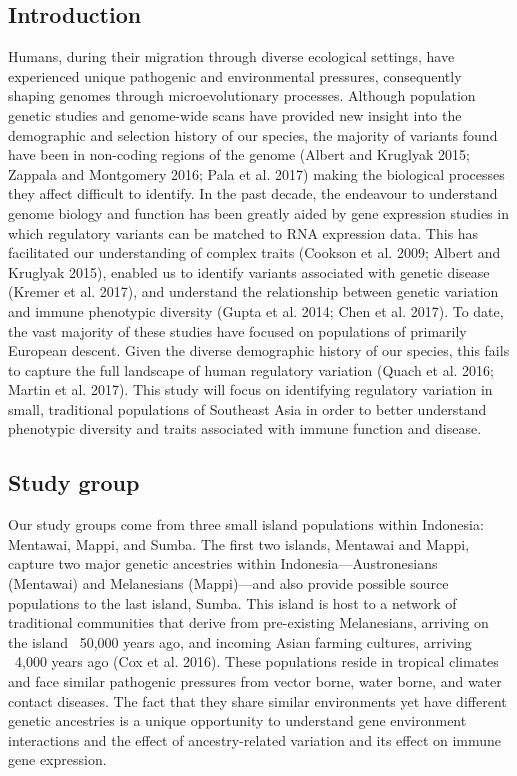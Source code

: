 \documentclass[12pt,a4paper,titlepage,twoside,openright]{book}
\begin{document}
\begin{mainmatter}
\mainmatterheadings

\chapter{Introduction}\label{}
Humans, during their migration through diverse ecological settings, have experienced unique pathogenic and environmental pressures, consequently shaping genomes through microevolutionary processes. Although population genetic studies and genome-wide scans have provided new insight into the demographic and selection history of our species, the majority of variants found have been in non-coding regions of the genome (Albert and Kruglyak 2015; Zappala and Montgomery 2016; Pala et al. 2017) making the biological processes they affect difficult to identify. In the past decade, the endeavour to understand genome biology and function has been greatly aided by gene expression studies in which regulatory variants can be matched to RNA expression data. This has facilitated our understanding of complex traits (Cookson et al. 2009; Albert and Kruglyak 2015), enabled us to identify variants associated with genetic disease (Kremer et al. 2017), and understand the relationship between genetic variation and immune phenotypic diversity (Gupta et al. 2014; Chen et al. 2017). To date, the vast majority of these studies have focused on populations of primarily European descent. Given the diverse demographic history of our species, this fails to capture the full landscape of human regulatory variation (Quach et al. 2016; Martin et al. 2017). This study will focus on identifying regulatory variation in small, traditional populations of Southeast Asia in order to better understand phenotypic diversity and traits associated with immune function and disease. 

\section{Study group}\label{}
Our study groups come from three small island populations within Indonesia: Mentawai, Mappi, and Sumba. The first two islands, Mentawai and Mappi, capture two major genetic ancestries within Indonesia—Austronesians (Mentawai) and Melanesians (Mappi)—and also provide possible source populations to the last island, Sumba. This island is host to a network of traditional communities that derive from pre-existing Melanesians, arriving on the island ~50,000 years ago, and incoming Asian farming cultures, arriving ~4,000 years ago (Cox et al. 2016). These populations reside in tropical climates and face similar pathogenic pressures from vector borne, water borne, and water contact diseases. The fact that they share similar environments yet have different genetic ancestries is a unique opportunity to understand gene environment interactions and the effect of ancestry-related variation and its effect on immune gene expression.


\end{mainmatter}
\end{document}
